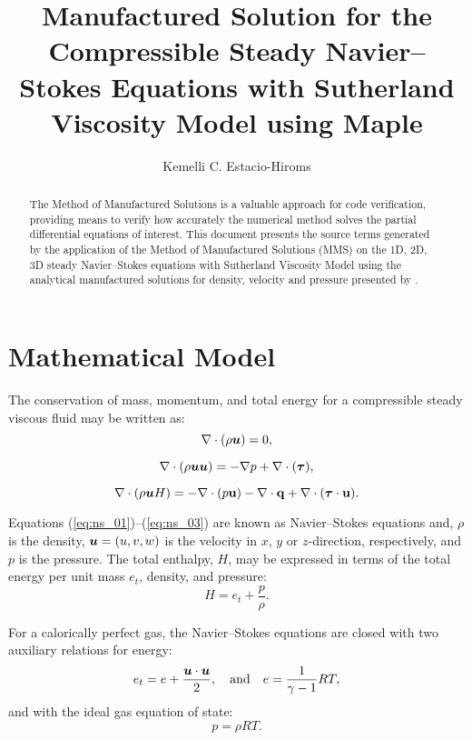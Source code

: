 \documentclass[10pt]{article}
\title{Manufactured Solution for the Compressible Steady Navier--Stokes Equations with Sutherland Viscosity Model using Maple}
\author{Kemelli C. Estacio-Hiroms}
\newcommand{\bv}[1]{\ensuremath{\mbox{\boldmath$ #1 $}}}
\begin{document}
\maketitle

\begin{abstract}
The Method of Manufactured Solutions is a valuable approach for code verification, providing means to verify how accurately the numerical method solves the partial differential equations of interest.
This document presents the source terms generated by the application of the Method of Manufactured Solutions (MMS) on the 1D, 2D, 3D steady Navier--Stokes equations  with Sutherland Viscosity Model using the analytical manufactured solutions for density, velocity and pressure presented by \citet{Roy2002}.
\end{abstract}





\section{Mathematical Model}
The conservation of mass, momentum, and total energy for a compressible steady viscous fluid may be written as:
\begin{equation}
 \label{eq:ns_01}
\nabla \cdot \left(\rho \bv{u}\right) = 0,
\end{equation}

\begin{equation}
 \label{eq:ns_02}
\nabla\cdot\left(\rho\bv{u}\bv{u}\right) = -\nabla p+  \nabla \cdot (\bv{\tau} ),
\end{equation}

\begin{equation}
 \label{eq:ns_03}
\nabla\cdot\left(\rho \bv{u} H\right) =-   \nabla\cdot(p  \mathbf{u}) -\nabla\cdot \mathbf{q} +  \nabla \cdot (\bv{\tau} \cdot \mathbf{u}).
\end{equation}


Equations (\ref{eq:ns_01})--(\ref{eq:ns_03}) are known as Navier--Stokes equations and, $\rho$ is the density, $\bv{u}=(u,v,w)$ is the velocity in $x$, $y$ or $z$-direction, respectively,    and $p$ is the pressure. The total enthalpy, $H$, may be expressed in terms of the total energy per unit mass $e_t$, density, and pressure:
$$H = e_t + \dfrac{p}{\rho}.$$

For a calorically perfect gas, the Navier--Stokes equations are closed with two auxiliary relations for energy:
\begin{equation}
 \label{eq:ns_04}
e_t= e+\dfrac{\bv{u}\cdot \bv{u}}{2},\quad\mbox{and}\quad e=\dfrac{1}{\gamma -1}RT ,
\end{equation}
and with the ideal gas equation of state:
\begin{equation}
 \label{eq:ns_05}
p=\rho RT.
\end{equation}
\end{document}
